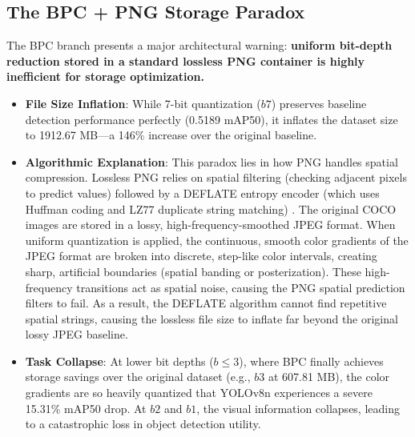 \documentclass[12pt, a4paper]{article}
\begin{document}
\subsection{The BPC + PNG Storage Paradox}
The BPC branch presents a major architectural warning: \textbf{uniform bit-depth reduction stored in a standard lossless PNG container is highly inefficient for storage optimization.}
\begin{itemize}
    \item \textbf{File Size Inflation}: While 7-bit quantization ($b7$) preserves baseline detection performance perfectly (0.5189 mAP50), it inflates the dataset size to 1912.67 MB---a 146\% increase over the original baseline.
    \item \textbf{Algorithmic Explanation}: This paradox lies in how PNG handles spatial compression. Lossless PNG relies on spatial filtering (checking adjacent pixels to predict values) followed by a DEFLATE entropy encoder (which uses Huffman coding and LZ77 duplicate string matching) \cite{w3c2003}. The original COCO images are stored in a lossy, high-frequency-smoothed JPEG format. When uniform quantization is applied, the continuous, smooth color gradients of the JPEG format are broken into discrete, step-like color intervals, creating sharp, artificial boundaries (spatial banding or posterization). These high-frequency transitions act as spatial noise, causing the PNG spatial prediction filters to fail. As a result, the DEFLATE algorithm cannot find repetitive spatial strings, causing the lossless file size to inflate far beyond the original lossy JPEG baseline.
    \item \textbf{Task Collapse}: At lower bit depths ($b \le 3$), where BPC finally achieves storage savings over the original dataset (e.g., $b3$ at 607.81 MB), the color gradients are so heavily quantized that YOLOv8n experiences a severe 15.31\% mAP50 drop. At $b2$ and $b1$, the visual information collapses, leading to a catastrophic loss in object detection utility.
\end{itemize}
\end{document}
